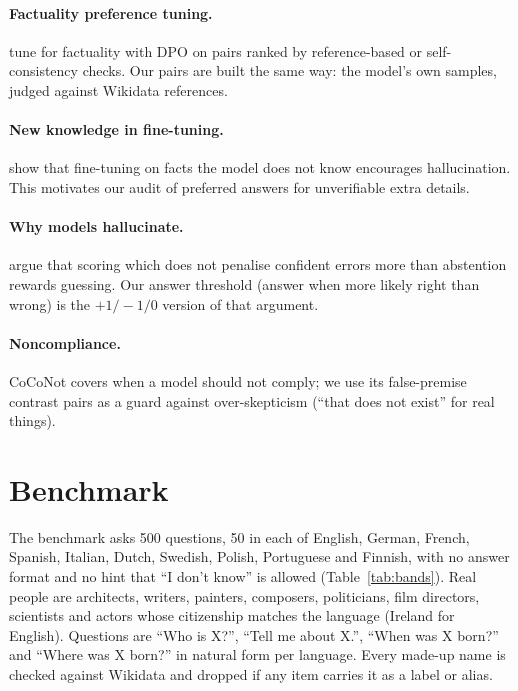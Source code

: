 \documentclass[11pt,a4paper]{article}
\begin{document}
\paragraph{Factuality preference tuning.}
\citet{tian2024factuality} tune for factuality with DPO \citep{rafailov2023dpo} on pairs ranked by reference-based or self-consistency checks.
Our pairs are built the same way: the model's own samples, judged against Wikidata references.

\paragraph{New knowledge in fine-tuning.}
\citet{gekhman2024newknowledge} show that fine-tuning on facts the model does not know encourages hallucination.
This motivates our audit of preferred answers for unverifiable extra details.

\paragraph{Why models hallucinate.}
\citet{kalai2025hallucinate} argue that scoring which does not penalise confident errors more than abstention rewards guessing.
Our answer threshold (answer when more likely right than wrong) is the $+1/-1/0$ version of that argument.

\paragraph{Noncompliance.}
CoCoNot \citep{brahman2024coconot} covers when a model should not comply; we use its false-premise contrast pairs as a guard against over-skepticism (``that does not exist'' for real things).

\section{Benchmark}
\label{sec:benchmark}

The benchmark asks 500 questions, 50 in each of English, German, French, Spanish, Italian, Dutch, Swedish, Polish, Portuguese and Finnish, with no answer format and no hint that ``I don't know'' is allowed (Table~\ref{tab:bands}).
Real people are architects, writers, painters, composers, politicians, film directors, scientists and actors whose citizenship matches the language (Ireland for English).
Questions are ``Who is X?'', ``Tell me about X.'', ``When was X born?'' and ``Where was X born?'' in natural form per language.
Every made-up name is checked against Wikidata and dropped if any item carries it as a label or alias.
\end{document}
